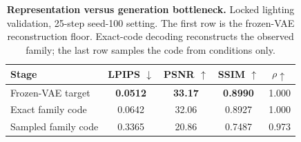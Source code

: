 \begin{table}[t]
\centering
\caption{\textbf{Representation versus generation bottleneck.} Locked lighting validation, 25-step seed-100 setting. The first row is the frozen-VAE reconstruction floor. Exact-code decoding reconstructs the observed family; the last row samples the code from conditions only.}
\label{tab:representation_bottleneck}
\scriptsize\setlength{\tabcolsep}{3pt}\renewcommand{\arraystretch}{1.12}
\begin{tabular*}{\linewidth}{@{\extracolsep{\fill}}lcccc@{}}
\toprule
Stage & LPIPS $\downarrow$ & PSNR $\uparrow$ & SSIM $\uparrow$ & $\rho\uparrow$ \\
\midrule
Frozen-VAE target & \textbf{0.0512} & \textbf{33.17} & \textbf{0.8990} & 1.000 \\
Exact family code & 0.0642 & 32.06 & 0.8927 & 1.000 \\
Sampled family code & 0.3365 & 20.86 & 0.7487 & 0.973 \\
\bottomrule
\end{tabular*}
\end{table}
